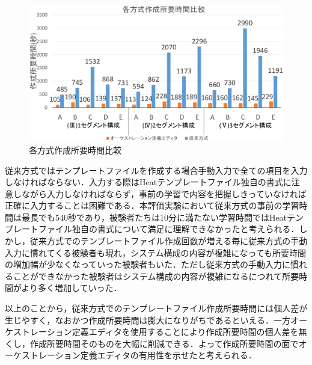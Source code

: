 \documentclass[mingoth]{kut-paper}		%
\begin{document}
\begin{description}
		\begin{figure}[H]
			\begin{center}
				\includegraphics[scale=0.42]{Document/Create_alltime.eps}
				\caption{各方式作成所要時間比較}
				\label{graf:9}
			\end{center}
		\end{figure}
		従来方式ではテンプレートファイルを作成する場合手動入力で全ての項目を入力しなければならない．入力する際はHeatテンプレートファイル独自の書式に注意しながら入力しなければならず，事前の学習で内容を把握しきっていなければ正確に入力することは困難である．本評価実験において従来方式の事前の学習時間は最長でも540秒であり，被験者たちは10分に満たない学習時間ではHeatテンプレートファイル独自の書式について満足に理解できなかったと考えられる．しかし，従来方式でのテンプレートファイル作成回数が増える毎に従来方式の手動入力に慣れてくる被験者も現れ，システム構成の内容が複雑になっても所要時間の増加幅が少なくなっていった被験者もいた．ただし従来方式の手動入力に慣れることができなかった被験者はシステム構成の内容が複雑になるにつれて所要時間がより多く増加していった．
		
		以上のことから，従来方式でのテンプレートファイル作成所要時間には個人差が生じやすく，なおかつ作成所要時間は膨大になりがちであるといえる．一方オーケストレーション定義エディタを使用することにより作成所要時間の個人差を無くし，作成所要時間そのものを大幅に削減できる．よって作成所要時間の面でオーケストレーション定義エディタの有用性を示せたと考えられる．
		

\end{description}
\end{document}
